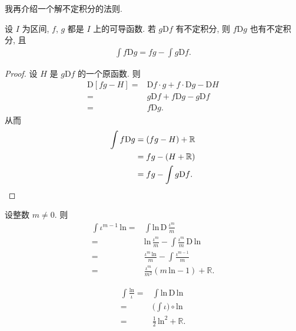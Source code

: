 我再介绍一个解不定积分的法则.

\begin{theorem}
    设 $I$ 为区间, $f$, $g$ 都是 $I$ 上的可导函数. 若 $g\mathrm{D}f$ 有不定积分, 则 $f\mathrm{D}g$ 也有不定积分, 且
    \begin{align*}
        \int {f\mathrm{D}g} = fg - \int {g\mathrm{D}f}.
    \end{align*}
\end{theorem}

\begin{proof}
    设 $H$ 是 $g\mathrm{D}f$ 的一个原函数. 则
    \begin{align*}
        \mathrm{D}[fg - H]
        = {} & \mathrm{D}f \cdot g + f \cdot \mathrm{D}g - \mathrm{D}H \\
        = {} & g\mathrm{D}f + f\mathrm{D}g - g\mathrm{D}f              \\
        = {} & f\mathrm{D}g.
    \end{align*}
    从而
    \begin{align*}
        \int {f\mathrm{D}g}
        = {} & (fg - H) + \mathbb{R}              \\
        = {} & fg - (H + \mathbb{R})              \\
        = {} & fg - \int {g\mathrm{D}f}. \qedhere
    \end{align*}
\end{proof}

\begin{example}
    设整数 $m \neq 0$. 则
    \begin{align*}
        \int {\iota^{m - 1} \, \mathrm{ln}}
        = {} & \int {\mathrm{ln}\, \mathrm{D}\,\frac{\iota^{m}}{m}} \\
        = {} & \mathrm{ln}\, \frac{\iota^{m}}{m}
        - \int {\frac{\iota^{m}}{m}\,\mathrm{D}\,\mathrm{ln}}       \\
        = {} & \frac{\iota^{m}\,\mathrm{ln}}{m}
        - \int {\frac{\iota^{m - 1}}{m}}                            \\
        = {} & \frac{\iota^{m}}{m^2}
        (m\,\mathrm{ln} - 1) + \mathbb{R}.
    \end{align*}
\end{example}

\begin{remark}
    \begin{align*}
        \int {\frac{\mathrm{ln}}{\iota}}
        = {} & \int {\mathrm{ln}\,\mathrm{D}\,\mathrm{ln}}  \\
        = {} & \Bigg( \int {\iota} \Bigg) \circ \mathrm{ln} \\
        = {} & \frac{1}{2}\, \mathrm{ln}^2 + \mathbb{R}.
    \end{align*}
\end{remark}

